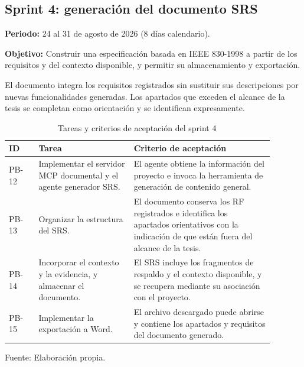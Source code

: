 \subsection{Sprint 4: generación del documento SRS}

\noindent\textbf{Periodo:}
24 al 31 de agosto de 2026
(8 días calendario).

\medskip
\noindent\textbf{Objetivo:}
Construir una especificación basada en IEEE 830-1998
a partir de los requisitos y del contexto disponible,
y permitir su almacenamiento y exportación.

El documento integra los requisitos registrados
sin sustituir sus descripciones por nuevas
funcionalidades generadas. Los apartados que exceden
el alcance de la tesis se completan como orientación
y se identifican expresamente.

\begin{table}[H]
    \centering
    \caption{Tareas y criterios de aceptación del sprint 4}
    \label{tab:sprint-4}
    \begingroup
    \small
    \setlength{\tabcolsep}{5pt}
    \renewcommand{\arraystretch}{1.15}
    \begin{tabular}{
        |>{\raggedright\arraybackslash}p{0.10\linewidth}
        |>{\raggedright\arraybackslash}p{0.32\linewidth}
        |>{\raggedright\arraybackslash}p{0.47\linewidth}|
    }
        \hline
        \textbf{ID} &
        \textbf{Tarea} &
        \textbf{Criterio de aceptación} \\
        \hline
        PB-12 &
        Implementar el servidor MCP documental
        y el agente generador SRS. &
        El agente obtiene la información del
        proyecto e invoca la herramienta
        de generación de contenido general. \\
        \hline
        PB-13 &
        Organizar la estructura del SRS. &
        El documento conserva los RF registrados
        e identifica los apartados orientativos
        con la indicación de que están fuera
        del alcance de la tesis. \\
        \hline
        PB-14 &
        Incorporar el contexto y la evidencia,
        y almacenar el documento. &
        El SRS incluye los fragmentos de respaldo
        y el contexto disponible, y se recupera
        mediante su asociación con el proyecto. \\
        \hline
        PB-15 &
        Implementar la exportación a Word. &
        El archivo descargado puede abrirse
        y contiene los apartados y requisitos
        del documento generado. \\
        \hline
    \end{tabular}

    \par\smallskip
    \begin{minipage}{0.95\linewidth}
        \footnotesize Fuente: Elaboración propia.
    \end{minipage}
    \endgroup
\end{table}

